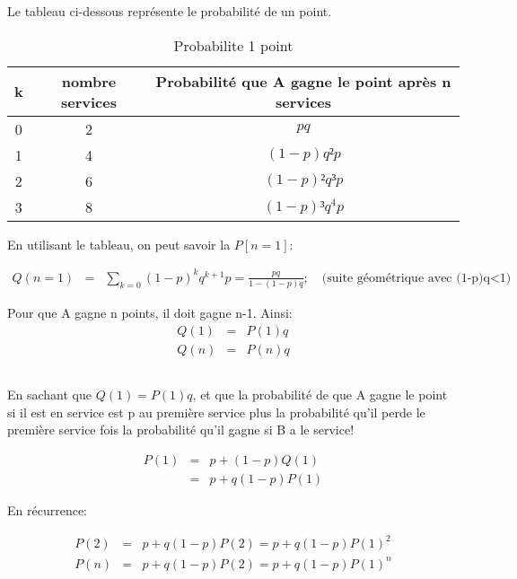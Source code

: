 \documentclass[a4paper]{article}
\begin{document}
Le tableau ci-dessous
représente le probabilité de un point.

\begin{table}[h!]
  \begin{centering}
    \begin{tabular}{|c|c|c|}
      \hline 
      k & nombre services & Probabilité que A gagne le point après n services\tabularnewline
      \hline 
      \hline 
      0 & 2 & $pq$\tabularnewline
      \hline 
      1 & 4 & $(1-p)q²p$\tabularnewline
      \hline 
      2 & 6 & $(1-p)²q³p$\tabularnewline
      \hline 
      3 & 8 & $(1-p)³q^{4}p$\tabularnewline
      \hline 
    \end{tabular}
    \par\end{centering}
  \caption{Probabilite 1 point}
\end{table}

En utilisant le tableau, on peut savoir la $P[n=1]$:

\begin{eqnarray*}
  Q(n=1)  &  =  &  \sum_{k=0}(1-p)^kq^{k+1}p= \frac{pq}{1-(1-p)q}  ;\quad  \text{(suite
    géométrique avec (1-p)q<1) }
\end{eqnarray*}

Pour que A gagne n points, il doit gagne n-1. Ainsi:
\begin{eqnarray*}
  Q(1) & = &P(1)q\\
  Q(n) & = &P(n)q
\end{eqnarray*}

\subsection{}
En sachant que $Q(1)=P(1)q$, et que la probabilité de que A gagne le point si il
est en  service est  p au première  service plus  la probabilité qu'il  perde le
première service fois la probabilité qu'il gagne si B a le service!

\begin{eqnarray*}
  P(1) & = &p+ (1-p)Q(1)\\
  & = &p+ q(1-p)P(1)
\end{eqnarray*}

En récurrence:

\begin{eqnarray*}
  P(2) & = &p+ q(1-p)P(2)=p+ q(1-p)P(1)^2\\
  P(n) & =& p+ q(1-p)P(2)=p+ q(1-p)P(1)^n
\end{eqnarray*}
\end{document}
